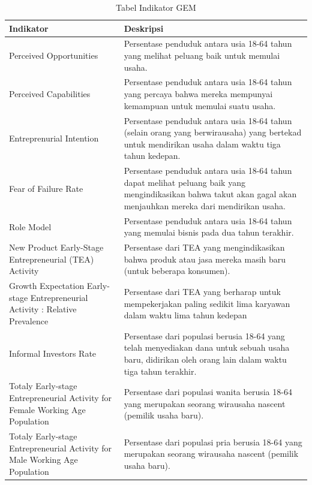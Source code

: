 \documentclass[a4paper,twoside]{article}
\begin{document}
\begin{enumerate}
\begin{table}[H]
\centering
\caption{Tabel Indikator GEM}
\begin{tabular}{|p{2cm}|p{11cm}|}
\hline
Indikator & Deskripsi\\
\hline
Perceived Opportunities & Persentase penduduk antara usia 18-64 tahun yang melihat peluang baik untuk memulai usaha. \\
\hline
Perceived Capabilities & Persentase penduduk antara usia 18-64 tahun yang percaya bahwa mereka mempunyai kemampuan untuk memulai suatu usaha. \\
\hline
Entreprenurial Intention & Persentase penduduk antara usia 18-64 tahun (selain orang yang berwirausaha) yang bertekad untuk mendirikan usaha dalam waktu tiga tahun kedepan.\\
\hline
Fear of Failure Rate & Persentase penduduk antara usia 18-64 tahun dapat melihat peluang baik yang mengindikasikan bahwa takut akan gagal akan menjauhkan mereka dari mendirikan usaha. \\
\hline
Role Model & Persentase penduduk antara usia 18-64 tahun yang memulai bisnis pada dua tahun terakhir.\\
\hline
New Product Early-Stage Entrepreneurial (TEA) Activity & Persentase dari TEA yang mengindikasikan bahwa produk atau jasa mereka masih baru (untuk beberapa konsumen).\\
\hline
Growth Expectation Early-stage Entrepreneurial Activity : Relative Prevalence & Persentase dari TEA yang berharap untuk mempekerjakan paling sedikit lima karyawan dalam waktu lima tahun kedepan\\
\hline
Informal Investors Rate & Persentase dari populasi berusia 18-64 yang telah menyediakan dana untuk sebuah usaha baru, didirikan oleh orang lain dalam waktu tiga tahun terakhir.\\
\hline
Totaly Early-stage Entrepreneurial Activity for Female Working Age Population & Persentase dari populasi wanita berusia 18-64 yang merupakan seorang wirausaha nascent (pemilik usaha baru).\\
\hline
Totaly Early-stage Entrepreneurial Activity for Male Working Age Population & Persentase dari populasi pria berusia 18-64 yang merupakan seorang wirausaha nascent (pemilik usaha baru).\\
\hline
\end{tabular}
\label{tabelindikator}
\end{table}


\end{enumerate}
\end{document}
